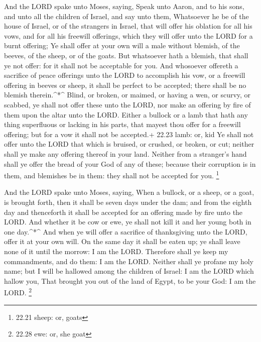  And the LORD spake unto Moses, saying,  Speak
unto Aaron, and to his sons, and unto all the children of Israel, and
say unto them, Whatsoever he be of the house of Israel, or of the
strangers in Israel, that will offer his oblation for all his vows, and
for all his freewill offerings, which they will offer unto the LORD for
a burnt offering;  Ye shall offer at your own will a male
without blemish, of the beeves, of the sheep, or of the goats.
 But whatsoever hath a blemish, that shall ye not offer:
for it shall not be acceptable for you.  And whosoever
offereth a sacrifice of peace offerings unto the LORD to accomplish his
vow, or a freewill offering in beeves or sheep, it shall be perfect to
be accepted; there shall be no blemish therein.\^{}*\^{} 
Blind, or broken, or maimed, or having a wen, or scurvy, or scabbed, ye
shall not offer these unto the LORD, nor make an offering by fire of
them upon the altar unto the LORD.  Either a bullock or a
lamb that hath any thing superfluous or lacking in his parts, that
mayest thou offer for a freewill offering; but for a vow it shall not be
accepted.+ 22.23 lamb: or, kid  Ye shall not offer unto the
LORD that which is bruised, or crushed, or broken, or cut; neither shall
ye make any offering thereof in your land.  Neither from a
stranger's hand shall ye offer the bread of your God of any of these;
because their corruption is in them, and blemishes be in them: they
shall not be accepted for you. \footnote{22.21 sheep: or, goats}

 And the LORD spake unto Moses, saying,  When
a bullock, or a sheep, or a goat, is brought forth, then it shall be
seven days under the dam; and from the eighth day and thenceforth it
shall be accepted for an offering made by fire unto the LORD.
 And whether it be cow or ewe, ye shall not kill it and her
young both in one day.\^{}*\^{}  And when ye will offer a
sacrifice of thanksgiving unto the LORD, offer it at your own will.
 On the same day it shall be eaten up; ye shall leave none
of it until the morrow: I am the LORD.  Therefore shall ye
keep my commandments, and do them: I am the LORD.  Neither
shall ye profane my holy name; but I will be hallowed among the children
of Israel: I am the LORD which hallow you,  That brought
you out of the land of Egypt, to be your God: I am the LORD. \footnote{22.28
  ewe: or, she goat}

